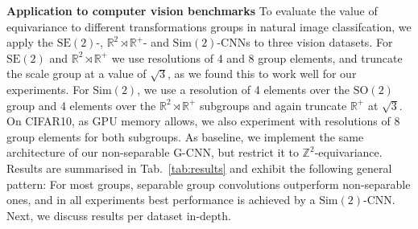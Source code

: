 \documentclass[nohyperref]{article}
\theoremstyle{plain}
\theoremstyle{definition}
\theoremstyle{remark}
\newcommand{\R}{\mathbb{R}}
\begin{document}
\textbf{Application to computer vision benchmarks}
To evaluate the value of equivariance to different transformations groups in natural image classifcation, we apply the $\mathrm{SE(2)}$-, $\R^2{\rtimes} \R^+$- and $\mathrm{Sim(2)}$-CNNs to three vision datasets. For $\mathrm{SE(2)}$ and $\R^2 {\rtimes} \R^+$ we use resolutions of 4 and 8 group elements, and truncate the scale group at a value of $\sqrt{3}$, as we found this to work well for our experiments. For $\mathrm{Sim(2)}$, we use a resolution of 4 elements over the $\mathrm{SO(2)}$ group and 4 elements over the $\R^2{ \rtimes} \R^+$ subgroups and again truncate $\R^+$ at $\sqrt{3}$. On CIFAR10, as GPU memory allows, we also experiment with resolutions of 8 group elements for both subgroups. As baseline, we implement the same architecture of our non-separable G-CNN, but restrict it to $\mathbb{Z}^2$-equivariance. Results are summarised in Tab.~\ref{tab:results} and exhibit the following general pattern: For most groups, separable group convolutions outperform non-separable ones, and in all experiments best performance is achieved by a $\mathrm{Sim(2)}$-CNN. Next, we discuss results per dataset in-depth.
\end{document}
